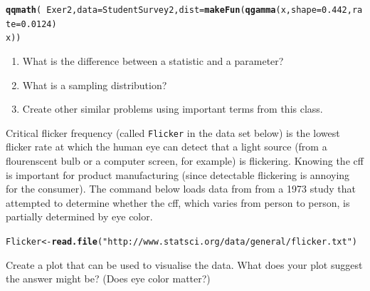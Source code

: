 \documentclass[twoside]{book}\usepackage[]{graphicx}\usepackage[]{xcolor}
\makeatletter
\newcommand{\hlnum}[1]{\textcolor[rgb]{0.686,0.059,0.569}{#1}}%
\newcommand{\hlstr}[1]{\textcolor[rgb]{0.192,0.494,0.8}{#1}}%
\newcommand{\hlopt}[1]{\textcolor[rgb]{0,0,0}{#1}}%
\newcommand{\hlstd}[1]{\textcolor[rgb]{0.345,0.345,0.345}{#1}}%
\newcommand{\hlkwb}[1]{\textcolor[rgb]{0.69,0.353,0.396}{#1}}%
\newcommand{\hlkwc}[1]{\textcolor[rgb]{0.333,0.667,0.333}{#1}}%
\newcommand{\hlkwd}[1]{\textcolor[rgb]{0.737,0.353,0.396}{\textbf{#1}}}%
\newenvironment{kframe}{%
 \def\at@end@of@kframe{}%
 \ifinner\ifhmode%
  \def\at@end@of@kframe{\end{minipage}}%
  \begin{minipage}{\columnwidth}%
 \fi\fi%
 \def\FrameCommand##1{\hskip\@totalleftmargin \hskip-\fboxsep
 \colorbox{shadecolor}{##1}\hskip-\fboxsep
     \hskip-\linewidth \hskip-\@totalleftmargin \hskip\columnwidth}%
 \MakeFramed {\advance\hsize-\width
   \@totalleftmargin\z@ \linewidth\hsize
   \@setminipage}}%
 {\par\unskip\endMakeFramed%
 \at@end@of@kframe}
\newenvironment{knitrout}{}{} %
\newcommand{\variable}[1]{{\color{green!50!black}\texttt{#1}}}
\newcounter{example}[section]
\makeatother
\begin{document}
\begin{solution}
\begin{knitrout}
\begin{kframe}
{\ttfamily\noindent\bfseries\color{errorcolor}{\#\# Error in eval(substitute(groups), data, environment(formula)): object 'StudentSurvey2' not found}}\begin{alltt}
\hlkwd{qqmath}\hlstd{(}\hlopt{~}\hlstd{Exer2,} \hlkwc{data} \hlstd{= StudentSurvey2,} \hlkwc{dist} \hlstd{=} \hlkwd{makeFun}\hlstd{(}\hlkwd{qgamma}\hlstd{(x,} \hlkwc{shape} \hlstd{=} \hlnum{0.442}\hlstd{,} \hlkwc{rate} \hlstd{=} \hlnum{0.0124}\hlstd{)} \hlopt{~}
    \hlstd{x))}
\end{alltt}


{\ttfamily\noindent\bfseries\color{errorcolor}{\#\# Error in eval(substitute(groups), data, environment(formula)): object 'StudentSurvey2' not found}}\end{kframe}
\end{knitrout}
\end{solution}
\fi

\begin{problem}
	\begin{enumerate}
		\item
			What is the difference between a statistic and a parameter?
		\item
			What is a sampling distribution?
		\item
			Create other similar problems using important terms from this class.
	\end{enumerate}
\end{problem}


\begin{problem}
Critical flicker frequency (called \variable{Flicker} in the data set below) is the 
lowest flicker rate at which the human eye
can detect that a light source (from a flourenscent bulb or a computer screen, for example)
is flickering.  Knowing the cff is important for product manufacturing (since detectable
flickering is annoying for the consumer).  The command below loads data from 
from a 1973 study that attempted to determine whether the cff, which varies 
from person to person, is partially determined by eye color.  
\begin{knitrout}
\color{fgcolor}\begin{kframe}
\begin{alltt}
\hlstd{Flicker} \hlkwb{<-} \hlkwd{read.file}\hlstd{(}\hlstr{"http://www.statsci.org/data/general/flicker.txt"}\hlstd{)}
\end{alltt}
\end{kframe}
\end{knitrout}

Create a plot that can be used to visualise the data.  What does your plot suggest
the answer might be? (Does eye color matter?)
\end{problem}
\end{document}

